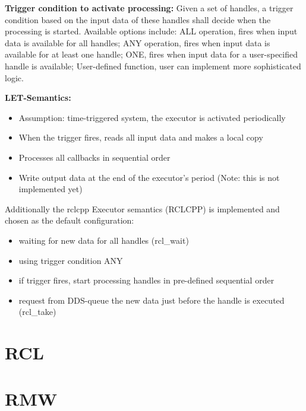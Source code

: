 \textbf{Trigger condition to activate processing:} Given a set of handles, a trigger condition based on the input data of these handles shall decide when the processing is started. Available options include: ALL operation, fires when input data is available for all handles; ANY operation, fires when input data is available for at least one handle; ONE, fires when input data for a user-specified handle is available; User-defined function, user can implement more sophisticated logic.

\textbf{LET-Semantics:} 
\begin{itemize}
    \item Assumption: time-triggered system, the executor is activated periodically
    \item When the trigger fires, reads all input data and makes a local copy
    \item Processes all callbacks in sequential order
    \item Write output data at the end of the executor's period (Note: this is not implemented yet)
\end{itemize}

Additionally the rclcpp Executor semantics (RCLCPP) is implemented and chosen as the default configuration:
\begin{itemize}
    \item waiting for new data for all handles (rcl\_wait)
    \item using trigger condition ANY
    \item if trigger fires, start processing handles in pre-defined sequential order
    \item request from DDS-queue the new data just before the handle is executed (rcl\_take)
\end{itemize}




\section{RCL}

\section{RMW}

